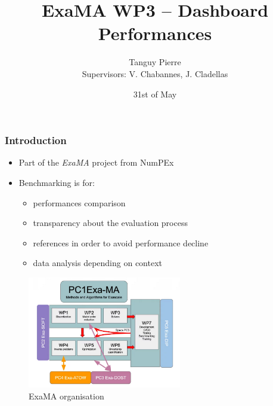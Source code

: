 \documentclass[10pt]{beamer}
\title{\textbf{ExaMA WP3 -- Dashboard Performances}}
\author[Tanguy PIERRE]{Tanguy Pierre\\[1cm] \small{Supervisors: V. Chabannes, J. Cladellas}}
\institute{University of Strasbourg}
\date{31st of May}
\begin{document}
\frame{\titlepage}


\begin{frame}
    \frametitle{\textbf{Introduction}}

    \begin{itemize}
        \addtolength{\itemsep}{10pt}
        \item Part of the \textit{ExaMA} project from NumPEx 
        \item Benchmarking is for:
        \begin{itemize}
            \item performances comparison
            \item transparency about the evaluation process
            \item references in order to avoid performance decline
            \item data analysis depending on context
        \end{itemize}
    \end{itemize}

    \begin{figure}
        \centering
        \includegraphics[width=0.6\textwidth]{../illustrations/ExaMa-orga.png}
        \caption{ExaMA organisation}
    \end{figure}
\end{frame}
\end{document}

